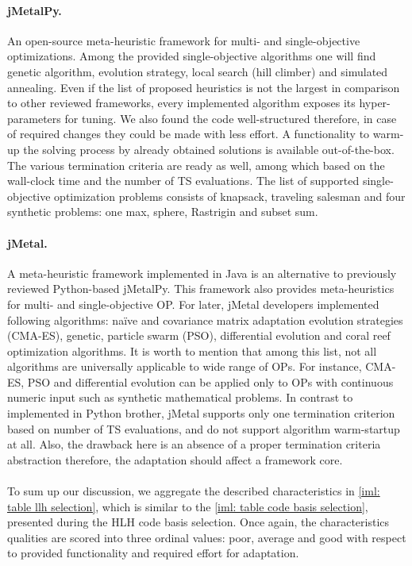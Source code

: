 \paragraph{jMetalPy.} An open-source meta-heuristic framework for multi- and single-objective optimizations. Among the provided single-objective algorithms one will find genetic algorithm, evolution strategy, local search (hill climber) and simulated annealing. Even if the list of proposed heuristics is not the largest in comparison to other reviewed frameworks, every implemented algorithm exposes its hyper-parameters for tuning. We also found the code well-structured therefore, in case of required changes they could be made with less effort. A functionality to warm-up the solving process by already obtained solutions is available out-of-the-box. The various termination criteria are ready as well, among which based on the wall-clock time and the number of TS evaluations. The list of supported single-objective optimization problems consists of knapsack, traveling salesman and four synthetic problems: one max, sphere, Rastrigin and subset sum.

\paragraph{jMetal.} A meta-heuristic framework implemented in Java is an alternative to previously reviewed Python-based jMetalPy. This framework also provides meta-heuristics for multi- and single-objective OP. For later, jMetal developers implemented following algorithms:  na\"ive and covariance matrix adaptation evolution strategies (CMA-ES), genetic, particle swarm (PSO), differential evolution and coral reef optimization algorithms. It is worth to mention that among this list, not all algorithms are universally applicable to wide range of OPs. For instance, CMA-ES, PSO and differential evolution can be applied only to OPs with continuous numeric input such as synthetic mathematical problems. In contrast to implemented in Python brother, jMetal supports only one termination criterion based on number of TS evaluations, and do not support algorithm warm-startup at all. Also, the drawback here is an absence of a proper termination criteria abstraction therefore, the adaptation should affect a framework core.

\paragraph{} To sum up our discussion, we aggregate the described characteristics in \cref{iml: table llh selection}, which is similar to the \cref{iml: table code basis selection}, presented during the HLH code basis selection. Once again, the characteristics qualities are scored into three ordinal values: poor, average and good with respect to provided functionality and required effort for adaptation.

